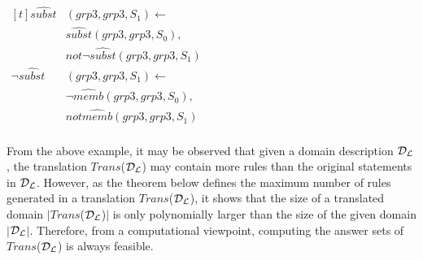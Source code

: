 \documentclass[global,twocolumn,final]{svjour}
\newenvironment{vexample}
  {\begin{example}\hspace{0.25em}}
  {\end{example}}
\newenvironment{vquote}
  {\begin{list}{}{\leftmargin 1em}\item[]}
  {\end{list}}
\begin{document}
\begin{vexample}
\begin{enumerate}
              \begin{vquote}
                \begin{math}
                  \begin{aligned}[t]
                    \hat{subst}&(grp3, grp3, S_{1}) \leftarrow \\
                    & \hat{subst}(grp3, grp3, S_{0}), \\
                    & not \lnot \hat{subst}(grp3, grp3, S_{1}) \\
                    \lnot \hat{subst}&(grp3, grp3, S_{1}) \leftarrow \\
                    & \lnot \hat{memb}(grp3, grp3, S_{0}), \\
                    & not \hat{memb}(grp3, grp3, S_{1}) \\
                  \end{aligned}
                \end{math}
              \end{vquote}
          \end{enumerate}
        \end{vexample}

        From the above example, it may be observed that given a domain
        description ${\cal D_{L}}$, the translation $Trans$(${\cal D_{L}}$) may
        contain more rules than the original statements in ${\cal D_{L}}$.
        However, as the theorem below defines the maximum number of rules
        generated in a translation $Trans$(${\cal D_{L}}$), it shows that
        the size of a translated domain $|$$Trans$(${\cal D_{L}}$)$|$ is only
        polynomially larger than the size of the given domain
        $|$${\cal D_{L}}$$|$. Therefore, from a computational viewpoint,
        computing the answer sets of $Trans$(${\cal D_{L}}$) is always
        feasible.
\end{document}
